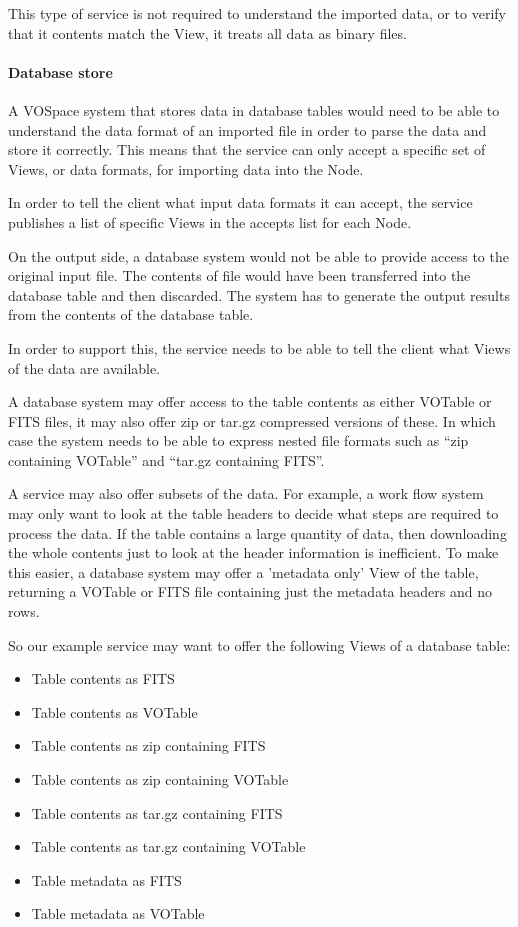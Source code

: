 \documentclass[11pt,a4paper]{ivoa}
\begin{document}
This type of service is not required to understand the imported data, or to verify that it contents match the View, it treats all data as binary files.

\paragraph{Database store}
A VOSpace system that stores data in database tables would need to be able to understand the data format of an imported file in order to parse the data and store it correctly. This means that the service can only accept a specific set of Views, or data formats, for importing data into the Node.

In order to tell the client what input data formats it can accept, the service publishes a list of specific Views in the accepts list for each Node.

On the output side, a database system would not be able to provide access to the original input file. The contents of file would have been transferred into the database table and then discarded. The system has to generate the output results from the contents of the database table.

In order to support this, the service needs to be able to tell the client what Views of the data are available.

A database system may offer access to the table contents as either VOTable or FITS files, it may also offer zip or tar.gz compressed versions of these. In which case the system needs to be able to express nested file formats such as ``zip containing VOTable'' and ``tar.gz containing FITS''.

A service may also offer subsets of the data. For example, a work flow system may only want to look at the table headers to decide what steps are required to process the data. If the table contains a large quantity of data, then downloading the whole contents just to look at the header information is inefficient. To make this easier, a database system may offer a 'metadata only' View of the table, returning a VOTable or FITS file containing just the metadata headers and no rows.

So our example service may want to offer the following Views of a database table:

\begin{itemize}
    \item Table contents as FITS
    \item Table contents as VOTable
    \item Table contents as zip containing FITS
    \item Table contents as zip containing VOTable
    \item Table contents as tar.gz containing FITS
    \item Table contents as tar.gz containing VOTable
    \item Table metadata as FITS
    \item Table metadata as VOTable
\end{itemize}
\end{document}
